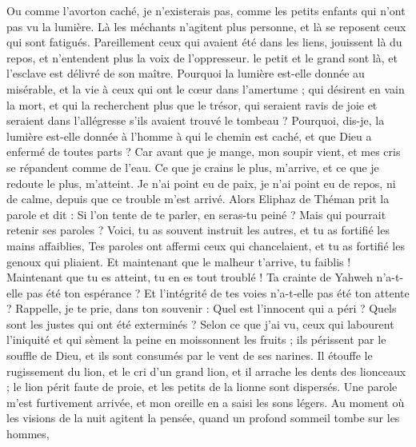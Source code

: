 \begin{multicols}{2}
Ou comme l'avorton caché, je n'existerais pas, comme les petits enfants qui n'ont pas vu la lumière.
Là les méchants n'agitent plus personne, et là se reposent ceux qui sont fatigués. 
Pareillement ceux qui avaient été dans les liens, jouissent là du repos, et n'entendent plus la voix de l'oppresseur. 
le petit et le grand sont là, et l'esclave est délivré de son maître.
Pourquoi la lumière est-elle donnée au misérable, et la vie à ceux qui ont le cœur dans l'amertume ;
qui désirent en vain la mort, et qui la recherchent plus que le trésor,
qui seraient ravis de joie et seraient dans l'allégresse s'ils avaient trouvé le tombeau ?
Pourquoi, dis-je, la lumière est-elle donnée à l'homme à qui le chemin est caché, et que Dieu a enfermé de toutes parts ?
Car avant que je mange, mon soupir vient, et mes cris se répandent comme de l'eau. 
Ce que je crains le plus, m'arrive, et ce que je redoute le plus, m'atteint. 
Je n'ai point eu de paix, je n'ai point eu de repos, ni de calme, depuis que ce trouble m'est arrivé. 
\VerseOne{}Alors Eliphaz de Théman prit la parole et dit :
Si l'on tente de te parler, en seras-tu peiné ? Mais qui pourrait retenir ses paroles ?
Voici, tu as souvent instruit les autres, et tu as fortifié les mains affaiblies,
Tes paroles ont affermi ceux qui chancelaient, et tu as fortifié les genoux qui pliaient.
Et maintenant que le malheur t'arrive, tu faiblis ! Maintenant que tu es atteint, tu en es tout troublé !
 Ta crainte de Yahweh n'a-t-elle pas été ton espérance ? Et l'intégrité de tes voies n'a-t-elle pas été ton attente ? 
Rappelle, je te prie, dans ton souvenir : Quel est l'innocent qui a péri ? Quels sont les justes qui ont été exterminés ?
Selon ce que j'ai vu, ceux qui labourent l'iniquité et qui sèment la peine en moissonnent les fruits ;
ils périssent par le souffle de Dieu, et ils sont consumés par le vent de ses narines.
Il étouffe le rugissement du lion, et le cri d'un grand lion, et il arrache les dents des lionceaux ;
le lion périt faute de proie, et les petits de la lionne sont dispersés.
Une parole m'est furtivement arrivée, et mon oreille en a saisi les sons légers.
Au moment où les visions de la nuit agitent la pensée, quand un profond sommeil tombe sur les hommes,

\end{multicols}
